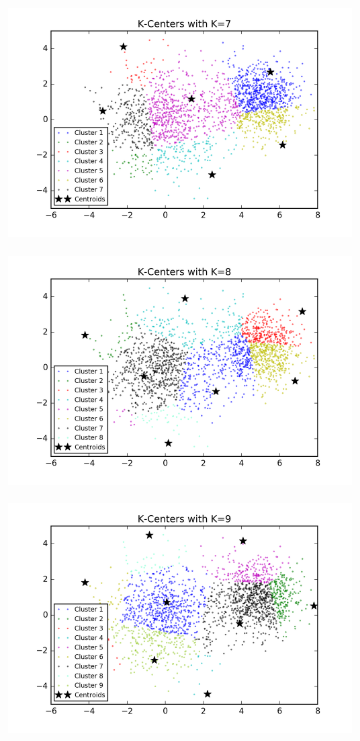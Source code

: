 \begin{description}
\begin{description}
\begin{figure}[!h]
\begin{subfigure}[b]{0.475\textwidth}
            \includegraphics[width=\textwidth]{./figures/clustering_kCenter_7.png}
        \end{subfigure}
        \hfill
        \begin{subfigure}[b]{0.475\textwidth}  
            \centering 
            \includegraphics[width=\textwidth]{./figures/clustering_kCenter_8.png}
        \end{subfigure}
        \begin{subfigure}[b]{0.475\textwidth}   
            \centering 
            \includegraphics[width=\textwidth]{./figures/clustering_kCenter_9.png}

\end{subfigure}
\end{figure}
\end{description}
\end{description}
